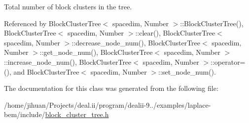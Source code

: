 Total number of block clusters in the tree. 

Referenced by Block\+Cluster\+Tree$<$ spacedim, Number $>$\+::\+Block\+Cluster\+Tree(), Block\+Cluster\+Tree$<$ spacedim, Number $>$\+::clear(), Block\+Cluster\+Tree$<$ spacedim, Number $>$\+::decrease\+\_\+node\+\_\+num(), Block\+Cluster\+Tree$<$ spacedim, Number $>$\+::get\+\_\+node\+\_\+num(), Block\+Cluster\+Tree$<$ spacedim, Number $>$\+::increase\+\_\+node\+\_\+num(), Block\+Cluster\+Tree$<$ spacedim, Number $>$\+::operator=(), and Block\+Cluster\+Tree$<$ spacedim, Number $>$\+::set\+\_\+node\+\_\+num().



The documentation for this class was generated from the following file\+:\begin{DoxyCompactItemize}
\item 
/home/jihuan/\+Projects/deal.\+ii/program/dealii-\/9../examples/laplace-\/bem/include/\hyperlink{block__cluster__tree_8h}{block\+\_\+cluster\+\_\+tree.\+h}\end{DoxyCompactItemize}
